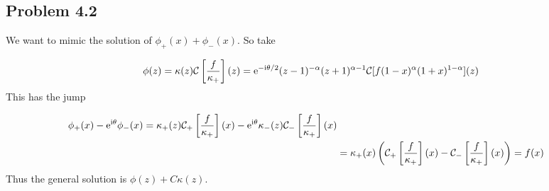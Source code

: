 \documentclass[12pt,a4paper]{article}
\def\I{ {\rm i} }
\def\E{ {\rm e} }
\def\CC{ {\cal C} }
\def\addtab#1={#1\;&=}
\def\ccr{\\\addtab}
\def\pr(#1){\left({#1}\right)}
\def\br[#1]{\left[{#1}\right]}
\def\addtab#1={#1\;&=}
\def\ccr{\\\addtab}
\begin{document}
\subsection{Problem 4.2}
We want to mimic the solution of $\phi_+(x) + \phi_-(x)$. So take

\[
\phi(z) = \kappa(z) \CC\br[{f \over \kappa_+}](z) =\E^{-\I \theta/2} (z-1)^{-\alpha}(z+1)^{\alpha-1} \CC[f (1-x)^{\alpha}(1+x)^{1-\alpha}](z)
\]
This has the jump


\begin{align*}
\phi_+(x) - \E^{\I \theta}\phi_-(x)  = \kappa_+(z) \CC_+\br[{f \over \kappa_+}](x) -  \E^{\I \theta}\kappa_-(z)\CC_-\br[{f \over \kappa_+}](x)  \ccr
= \kappa_+(x)  \pr({\CC_+\br[{f \over \kappa_+}](x) - \CC_-\br[{f \over \kappa_+}](x)  }) = f(x)
\end{align*}
Thus the general solution is $\phi(z) + C \kappa(z)$.
\end{document}
